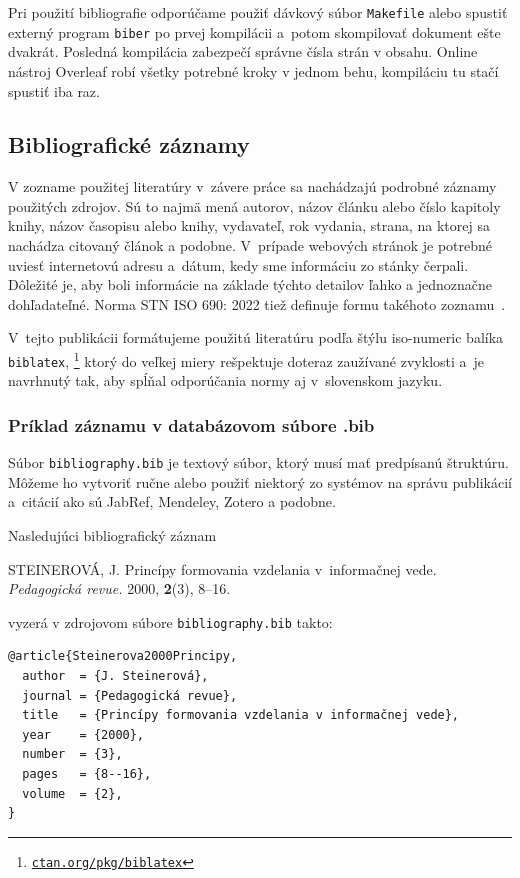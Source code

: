 Pri použití bibliografie odporúčame použiť dávkový súbor 
\texttt{Makefile} alebo spustiť externý program \texttt{biber} 
po prvej kompilácii a~potom skompilovať dokument ešte dvakrát.
Posledná kompilácia zabezpečí správne čísla strán v obsahu.
Online nástroj Overleaf robí všetky potrebné kroky v jednom behu,
kompiláciu tu stačí spustiť iba raz.

\subsection{Bibliografické záznamy}
V zozname použitej literatúry v~závere práce sa nachádzajú 
podrobné záznamy použitých zdrojov.
Sú to najmä mená autorov, názov článku alebo číslo kapitoly 
knihy, názov časopisu alebo knihy, vydavateľ, rok vydania, 
strana, na ktorej sa nachádza citovaný článok a podobne.
V~prípade webových stránok je potrebné uviesť internetovú adresu 
a~dátum, kedy sme informáciu zo stánky čerpali.
Dôležité je, aby boli informácie na základe týchto detailov 
ľahko a jednoznačne dohľadateľné.
Norma STN ISO 690: 2022 tiež definuje formu takéhoto zoznamu~\cite{iso690}.

V~tejto publikácii formátujeme použitú literatúru
podľa štýlu iso-numeric \cite{Hoftich2022iso690} balíka \texttt{biblatex},
\footnote{\href{https://ctan.org/pkg/biblatex}{\texttt{ctan.org/pkg/biblatex}}}
ktorý do veľkej miery rešpektuje doteraz zaužívané zvyklosti
a~je navrhnutý tak,
aby spĺňal odporúčania normy aj v~slovenskom jazyku.

\subsubsection{Príklad záznamu v databázovom súbore .bib}\label{sec:citExample}
Súbor \texttt{bibliography.bib} je textový súbor, ktorý musí mať predpísanú štruktúru.
Môžeme ho vytvoriť ručne alebo použiť niektorý zo systémov na správu publikácií a~citácií ako sú JabRef, Mendeley, Zotero a podobne.

Nasledujúci bibliografický záznam
\begin{trivlist}
  \item STEINEROVÁ, J. Princípy formovania vzdelania 
  v~informačnej vede. \textit{Pedagogická revue.} 2000, \textbf{2}(3), 8--16.
\end{trivlist}
vyzerá v zdrojovom súbore \texttt{bibliography.bib} takto:
\begin{verbatim}
@article{Steinerova2000Principy,
  author  = {J. Steinerová},
  journal = {Pedagogická revue},
  title   = {Princípy formovania vzdelania v informačnej vede},
  year    = {2000},
  number  = {3},
  pages   = {8--16},
  volume  = {2},
}
\end{verbatim}

